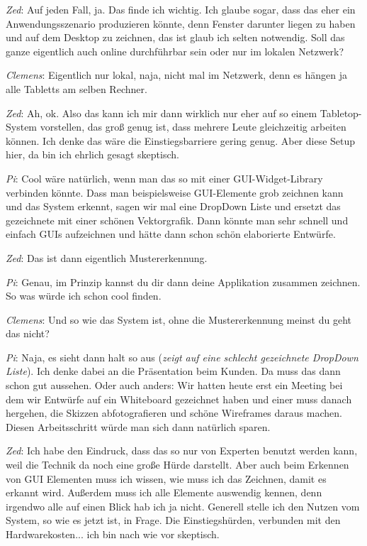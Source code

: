 \medskip \emph{Zed}: Auf jeden Fall, ja. Das finde ich wichtig. Ich glaube sogar, dass das eher ein Anwendungsszenario produzieren könnte, denn Fenster darunter liegen zu haben und auf dem Desktop zu zeichnen, das ist glaub ich selten notwendig. Soll das ganze eigentlich auch online durchführbar sein oder nur im lokalen Netzwerk?

\medskip \emph{Clemens}: Eigentlich nur lokal, naja, nicht mal im Netzwerk, denn es hängen ja alle Tabletts am selben Rechner.

\medskip \emph{Zed}: Ah, ok. Also das kann ich mir dann wirklich nur eher auf so einem Tabletop-System vorstellen, das groß genug ist, dass mehrere Leute gleichzeitig arbeiten können. Ich denke das wäre die Einstiegsbarriere gering genug. Aber diese Setup hier, da bin ich ehrlich gesagt skeptisch.

\medskip \emph{Pi}: Cool wäre natürlich, wenn man das so mit einer \ac{GUI}-Widget-Library verbinden könnte. Dass man beispielsweise \ac{GUI}-Elemente grob zeichnen kann und das System erkennt, sagen wir mal eine DropDown Liste und ersetzt das gezeichnete mit einer schönen Vektorgrafik. Dann könnte man sehr schnell und einfach \acp{GUI} aufzeichnen und hätte dann schon schön elaborierte Entwürfe.

\medskip \emph{Zed}: Das ist dann eigentlich Mustererkennung.

\medskip \emph{Pi}: Genau, im Prinzip kannst du dir dann deine Applikation zusammen zeichnen. So was würde ich schon cool finden.

\medskip \emph{Clemens}: Und so wie das System ist, ohne die Mustererkennung meinst du geht das nicht?

\medskip \emph{Pi}: Naja, es sieht dann halt so aus (\emph{zeigt auf eine schlecht gezeichnete DropDown Liste}). Ich denke dabei an die Präsentation beim Kunden. Da muss das dann schon gut aussehen. Oder auch anders: Wir hatten heute erst ein Meeting bei dem wir Entwürfe auf ein Whiteboard gezeichnet haben und einer muss danach hergehen, die Skizzen abfotografieren und schöne Wireframes daraus machen. Diesen Arbeitsschritt würde man sich dann natürlich sparen.

\medskip \emph{Zed}: Ich habe den Eindruck, dass das so nur von Experten benutzt werden kann, weil die Technik da noch eine große Hürde darstellt. Aber auch beim Erkennen von \ac{GUI} Elementen muss ich wissen, wie muss ich das Zeichnen, damit es erkannt wird. Außerdem muss ich alle Elemente auswendig kennen, denn irgendwo alle auf einen Blick hab ich ja nicht. Generell stelle ich den Nutzen vom System, so wie es jetzt ist, in Frage. Die Einstiegshürden, verbunden mit den Hardwarekosten... ich bin nach wie vor skeptisch.

